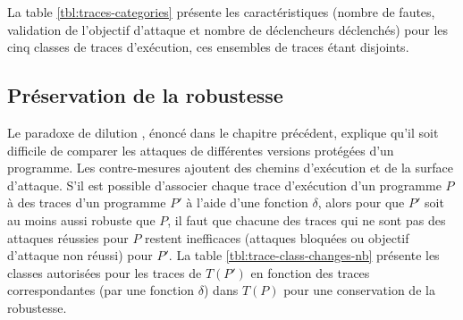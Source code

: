
            La table \ref{tbl:traces-categories} présente les caractéristiques (nombre de fautes, validation de l'objectif d'attaque et nombre de déclencheurs déclenchés) pour les cinq classes de traces d'exécution, ces ensembles de traces étant disjoints.
            
        \subsection{Préservation de la robustesse}
        \label{sec:ccpo-rob-preserv}

            Le paradoxe de dilution \cite{Dureuil/Phd16}, énoncé dans le chapitre précédent, explique qu'il soit difficile de comparer les attaques de différentes versions protégées d'un programme. Les contre-mesures ajoutent des chemins d'exécution et de la surface d'attaque.
            S'il est possible d'associer chaque trace d'exécution d'un programme $P$ à des traces d'un programme $P'$ à l'aide d'une fonction $\delta$, alors pour que $P'$ soit au moins aussi robuste que $P$, il faut que chacune des traces qui ne sont pas des attaques réussies pour $P$ restent inefficaces (attaques bloquées ou objectif d'attaque non réussi) pour $P'$. La table \ref{tbl:trace-class-changes-nb} présente les classes autorisées pour les traces de $T(P')$ en fonction des traces correspondantes (par une fonction $\delta$) dans $T(P)$ pour une conservation de la robustesse.
                                
